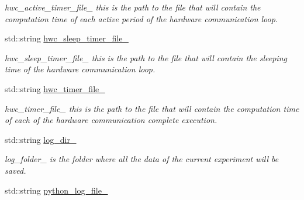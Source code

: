 \begin{DoxyCompactItemize}
\begin{DoxyCompactList}\small\item\em hwc\+\_\+active\+\_\+timer\+\_\+file\+\_\+ this is the path to the file that will contain the computation time of each active period of the hardware communication loop. \end{DoxyCompactList}\item 
std\+::string \hyperlink{classdynamic__graph_1_1DynamicGraphManager_a5db6275d202963665a35c5eb2e68088d}{hwc\+\_\+sleep\+\_\+timer\+\_\+file\+\_\+}\hypertarget{classdynamic__graph_1_1DynamicGraphManager_a5db6275d202963665a35c5eb2e68088d}{}\label{classdynamic__graph_1_1DynamicGraphManager_a5db6275d202963665a35c5eb2e68088d}

\begin{DoxyCompactList}\small\item\em hwc\+\_\+sleep\+\_\+timer\+\_\+file\+\_\+ this is the path to the file that will contain the sleeping time of the hardware communication loop. \end{DoxyCompactList}\item 
std\+::string \hyperlink{classdynamic__graph_1_1DynamicGraphManager_a84f97c9eebbecee1af314e74fe22d8ed}{hwc\+\_\+timer\+\_\+file\+\_\+}\hypertarget{classdynamic__graph_1_1DynamicGraphManager_a84f97c9eebbecee1af314e74fe22d8ed}{}\label{classdynamic__graph_1_1DynamicGraphManager_a84f97c9eebbecee1af314e74fe22d8ed}

\begin{DoxyCompactList}\small\item\em hwc\+\_\+timer\+\_\+file\+\_\+ this is the path to the file that will contain the computation time of each of the hardware communication complete execution. \end{DoxyCompactList}\item 
std\+::string \hyperlink{classdynamic__graph_1_1DynamicGraphManager_ace11054bf618c29e4fda9a77905e8ff0}{log\+\_\+dir\+\_\+}\hypertarget{classdynamic__graph_1_1DynamicGraphManager_ace11054bf618c29e4fda9a77905e8ff0}{}\label{classdynamic__graph_1_1DynamicGraphManager_ace11054bf618c29e4fda9a77905e8ff0}

\begin{DoxyCompactList}\small\item\em log\+\_\+folder\+\_\+ is the folder where all the data of the current experiment will be saved. \end{DoxyCompactList}\item 
std\+::string \hyperlink{classdynamic__graph_1_1DynamicGraphManager_ac3be4a8d0596390bc5dd055321a7df55}{python\+\_\+log\+\_\+file\+\_\+}\hypertarget{classdynamic__graph_1_1DynamicGraphManager_ac3be4a8d0596390bc5dd055321a7df55}{}\label{classdynamic__graph_1_1DynamicGraphManager_ac3be4a8d0596390bc5dd055321a7df55}


\end{DoxyCompactItemize}
